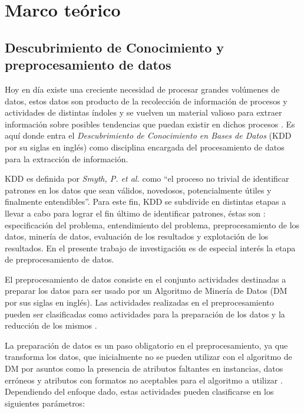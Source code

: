 \chapter{Marco teórico}
\label{capitulo1}

\section{Descubrimiento de Conocimiento y preprocesamiento de datos}

Hoy en día existe una creciente necesidad de procesar grandes volúmenes de datos, estos datos son producto de la recolección de información de procesos y actividades de distintas índoles y se vuelven un material valioso para extraer información sobre posibles tendencias que puedan existir en dichos procesos \cite{han2011data}. Es aquí donde entra el \emph{Descubrimiento de Conocimiento en Bases de Datos} (KDD por su siglas en inglés) como disciplina encargada del procesamiento de datos para la extracción de información.

KDD es definida por \emph{Smyth, P. et al.} \cite{fayyd1996data} como ``el proceso no trivial de identificar patrones en los datos que sean válidos, novedosos, potencialmente útiles y finalmente entendibles''. Para este fin, KDD se subdivide en distintas etapas a llevar a cabo para lograr el fin último de identificar patrones, éstas son \cite{garcia2016data}: especificación del problema, entendimiento del problema, preprocesamiento de los datos, minería de datos, evaluación de los resultados y explotación de los resultados. En el presente trabajo de investigación es de especial interés la etapa de preprocesamiento de datos.

El preprocesamiento de datos consiste en el conjunto actividades destinadas a preparar los datos para ser usado por un Algoritmo de Minería de Datos (DM por sus siglas en inglés). Las actividades realizadas en el preprocesamiento pueden ser clasificadas como actividades para la preparación de los datos y la reducción de los mismos \cite{garcia2016data}.

La preparación de datos es un paso obligatorio en el preprocesamiento, ya que transforma los datos, que inicialmente no se pueden utilizar con el algoritmo de DM por asuntos como la presencia de atributos faltantes en instancias, datos erróneos y atributos con formatos no aceptables para el algoritmo a utilizar \cite{garcia2016data}. Dependiendo del enfoque dado, estas actividades pueden clasificarse en los siguientes parámetros:

